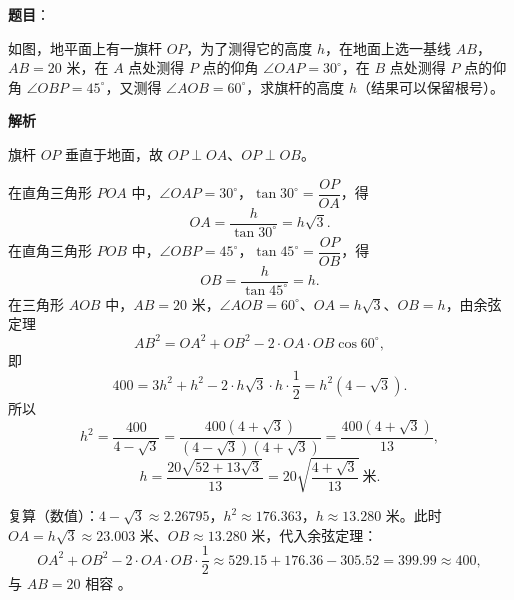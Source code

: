\begin{answer}

\textbf{题目}：

如图，地平面上有一旗杆 $OP$，为了测得它的高度 $h$，在地面上选一基线 $AB$，$AB=20$ 米，在 $A$ 点处测得 $P$ 点的仰角 $\angle OAP=30^\circ$，在 $B$ 点处测得 $P$ 点的仰角 $\angle OBP=45^\circ$，又测得 $\angle AOB=60^\circ$，求旗杆的高度 $h$（结果可以保留根号）。
\nopagebreak[4]
\begin{center}\end{center}
\nopagebreak[4]
\textbf{解析}
\nopagebreak[4]
\begin{center}\end{center}
\nopagebreak[4]
旗杆 $OP$ 垂直于地面，故 $OP\perp OA$、$OP\perp OB$。

在直角三角形 $POA$ 中，$\angle OAP=30^\circ$，$\tan30^\circ=\dfrac{OP}{OA}$，得
\nopagebreak[4]
\[
OA=\frac{h}{\tan30^\circ}=h\sqrt3.
\]
在直角三角形 $POB$ 中，$\angle OBP=45^\circ$，$\tan45^\circ=\dfrac{OP}{OB}$，得
\nopagebreak[4]
\[
OB=\frac{h}{\tan45^\circ}=h.
\]
在三角形 $AOB$ 中，$AB=20$ 米，$\angle AOB=60^\circ$、$OA=h\sqrt3$、$OB=h$，由余弦定理
\nopagebreak[4]
\[
AB^2=OA^2+OB^2-2\cdot OA\cdot OB\cos60^\circ,
\]
即
\nopagebreak[4]
\[
400=3h^2+h^2-2\cdot h\sqrt3\cdot h\cdot\frac12=h^2\left(4-\sqrt3\right).
\]
所以
\nopagebreak[4]
\[
h^2=\frac{400}{4-\sqrt3}=\frac{400\left(4+\sqrt3\right)}{\left(4-\sqrt3\right)\left(4+\sqrt3\right)}=\frac{400\left(4+\sqrt3\right)}{13},
\]
\nopagebreak[4]
\[
h=\frac{20\sqrt{52+13\sqrt3}}{13}=20\sqrt{\frac{4+\sqrt3}{13}}\ \text{米}.
\]

复算（数值）：$4-\sqrt3\approx2.26795$，$h^2\approx176.363$，$h\approx13.280$ 米。此时 $OA=h\sqrt3\approx23.003$ 米、$OB\approx13.280$ 米，代入余弦定理：
\nopagebreak[4]
\[
OA^2+OB^2-2\cdot OA\cdot OB\cdot\frac12\approx529.15+176.36-305.52=399.99\approx400,
\]
与 $AB=20$ 相容 。


\end{answer}
